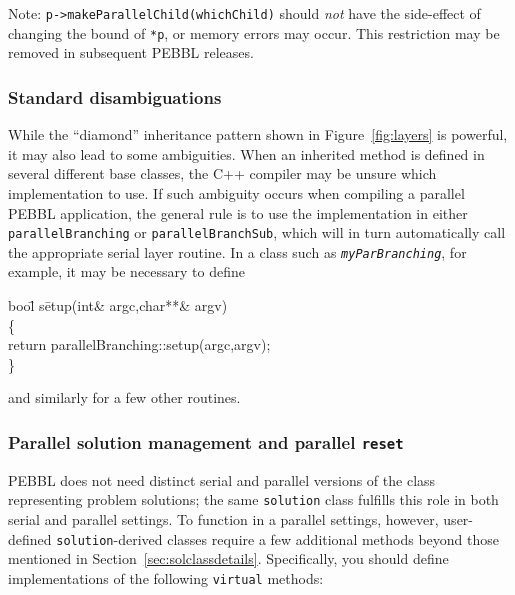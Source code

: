 Note: \texttt{p->makeParallelChild(whichChild)} should \emph{not} have
the side-effect of changing the bound of \texttt{*p}, or memory errors
may occur.  This restriction may be removed in subsequent PEBBL
releases.


\subsubsection{Standard disambiguations}
While the ``diamond'' inheritance pattern shown in
Figure~\ref{fig:layers} is powerful, it may also lead
to some ambiguities.  When an inherited method is defined in several
different base classes, the C++ compiler may be unsure which
implementation to use.  If such ambiguity occurs when compiling a
parallel PEBBL application, the general rule is to use the
implementation in either \texttt{parallelBranching} or
\texttt{parallelBranchSub}, which will in turn automatically call the
appropriate serial layer routine.  In a class such as
\texttt{\textit{myParBranching}}, for example, it may be necessary to
define
\begin{codeblock}
boo\=l s\=etup(int\& argc,char**\& argv) \\
\>    \{  \\
\>\>      return parallelBranching::setup(argc,argv); \\
 \>   \}
\end{codeblock}
and similarly for a few other routines.


\subsubsection{Parallel solution management and parallel \texttt{reset}}
\label{sec:parsol}
PEBBL does not need distinct serial and parallel versions of the class
representing problem solutions; the same \texttt{solution} class
fulfills this role in both serial and parallel settings.  To function
in a parallel settings, however, user-defined
\texttt{solution}-derived classes require a few additional methods
beyond those mentioned in Section~\ref{sec:solclassdetails}.
Specifically, you should define implementations of the following
\texttt{virtual} methods:

